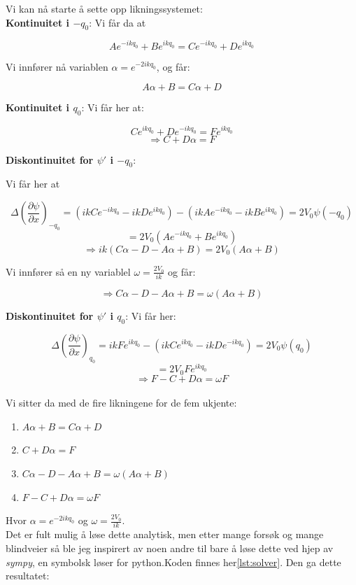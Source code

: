 \documentclass[a4paper,norsk, 10pt]{article}
\numberwithin{equation}{section}
\begin{document}
Vi kan nå starte å sette opp likningssystemet:\\

\textbf{Kontinuitet i $-q_0$}: 
Vi får da at 

$$
Ae^{-ikq_0} + Be^{ikq_0} = Ce^{-ikq_0} + De^{ikq_0}
$$

Vi innfører nå variablen $\alpha = e^{-2ikq_0}$, og får:

$$
A\alpha + B =C\alpha + D
$$

\textbf{Kontinuitet i $q_0$}: 
Vi får her at:

$$
Ce^{ikq_0} + De^{-ikq_0} = Fe^{ikq_0} 
$$
$$
\Rightarrow C + D\alpha = F
$$

\newpage

\textbf{Diskontinuitet for $\psi'$ i $-q_0$}:

Vi får her at

$$
\Delta \left(\frac{\partial \psi}{\partial x}\right)_{-q_0} = (ikCe^{-ikq_0} -ikDe^{ikq_0} ) - (ikAe^{-ikq_0} - ikBe^{ikq_0}) = 2V_0\psi(-q_0) 
$$
$$
= 2V_0(Ae^{-ikq_0} + Be^{ikq_0})
$$
$$
\Rightarrow ik(C\alpha - D -A\alpha + B) = 2V_0(A\alpha + B)
$$

Vi innfører så en ny variablel $\omega = \frac{2V_0}{ik}$ og får:

$$
\Rightarrow C\alpha - D -A\alpha + B = \omega(A\alpha + B)
$$

\textbf{Diskontinuitet for $\psi'$ i $q_0$}:
Vi får her:

$$
\Delta \left(\frac{\partial \psi}{\partial x}\right)_{q_0} = ikFe^{ikq_0} - (ikCe^{ikq_0} -ikDe^{-ikq_0}) = 2V_0\psi(q_0)
$$
$$
= 2V_0Fe^{ikq_0}
$$
$$
\Rightarrow F - C + D\alpha = \omega F 
$$\\


Vi sitter da med de fire likningene for de fem ukjente:

\begin{enumerate}
\item $A\alpha + B = C\alpha + D$
\item $C + D\alpha = F$
\item $C\alpha - D -A\alpha + B = \omega(A\alpha + B)$
\item $F - C + D\alpha = \omega F $
\end{enumerate}

Hvor $\alpha = e^{-2ikq_0}$ og $\omega = \frac{2V_0}{ik}$.\\

Det er fult mulig å løse dette analytisk, men etter mange forsøk og mange blindveier så ble jeg inspirert av noen andre til bare å løse dette ved hjep av \textit{sympy}, en symbolsk løser for python.Koden finnes her\ref{lst:solver}. Den ga dette resultatet:
\end{document}
